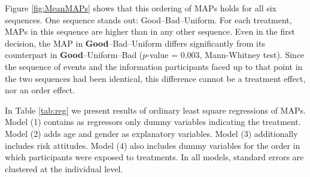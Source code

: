 Figure \ref{fig:MeanMAPs} shows that this ordering of MAPs holds for all six sequences.
One sequence stands out: Good--Bad--Uniform.
For each treatment, MAPs in this sequence are higher than in any other sequence.
Even in the first decision, the MAP in \textbf{Good}--Bad--Uniform differs significantly from its counterpart in \textbf{Good}--Uniform--Bad ($p$-value = 0.003, Mann-Whitney test).
Since the sequence of events and the information participants faced up to that point in the two sequences had been identical, this difference cannot be a treatment effect, nor an order effect.

In Table \ref{tab:reg} we present results of ordinary least square regressions of MAPs.
Model (1) contains as regressors only dummy variables indicating the treatment.
Model (2) adds age and gender as explanatory variables.
Model (3) additionally includes risk attitudes.
Model (4) also includes dummy variables for the order in which participants were exposed to treatments.
In all models, standard errors are clustered at the individual level.


